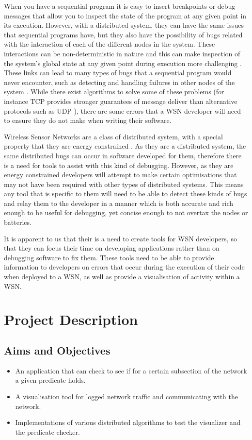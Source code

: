 \documentclass[a4paper]{article}
\begin{document}
When you have a sequential program it is easy to insert breakpoints or debug
messages that allow you to inspect the state of the program at any given point
in its execution. However, with a distributed system, they can have the same
issues that sequential programs have, but they also have the possibility of
bugs related with the interaction of each of the different nodes in the system.
These interactions can be non-deterministic \cite{liu2007wids} in nature and
this can make inspection of the system's global state at any given point during
execution more challenging \cite{chandy1985distributed}. These links can lead to
many types of bugs that a sequential program would never encounter, such as detecting and handling failures in other
nodes of the system \cite{5623434}. While there exist algorithms to solve some
of these problems (for instance TCP provides stronger guarantees of message
deliver than alternative protocols such as UDP
\cite[p.~532]{Tanenbaum:2002:CN:572404}), there are some errors that a WSN
developer will need to ensure they do not make when writing their software.

Wireless Sensor Networks are a class of distributed system, with a special
property that they are energy constrained \cite{6023235}. As they are a
distributed system, the same distributed bugs can occur in software developed
for them, therefore there is a need for tools to assist with this kind of
debugging. However, as they are energy constrained developers will attempt to
make certain optimisations that may not have been required with other types of
distributed systems. This means any tool that is specific to them will need to
be able to detect these kinds of bugs and relay them to the developer in a
manner which is both accurate and rich enough to be useful for debugging, yet 
concise enough to not overtax the nodes or batteries.

It is apparent to us that their is a need to create tools for WSN developers,
so that they can focus their time on developing applications rather than on
debugging software to fix them. These tools need to be able to provide
information to developers on errors that occur during the execution of their code 
when deployed to a WSN, as well as provide a visualisation of activity within a WSN.

\section{Project Description}

\subsection{Aims and Objectives}
\begin{itemize}
	\item An application that can check to see if for a certain subsection of the network a given predicate holds.
	\item A visualisation tool for logged network traffic and communicating with the network.
	\item Implementations of various distributed algorithms to test the visualizer and the predicate checker.
\end{itemize}
\end{document}
